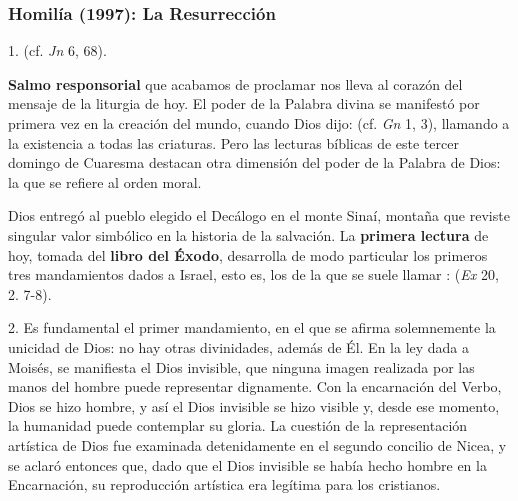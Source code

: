 \subsubsection{Homilía (1997): La Resurrección}


\begin{body}
1.  (cf. \textit{Jn} 6, 68).

 \textbf{Salmo responsorial} que acabamos de proclamar nos lleva al corazón del mensaje de la liturgia de hoy. El poder de la Palabra divina se manifestó por primera vez en la creación del mundo, cuando Dios dijo:  (cf. \textit{Gn} 1, 3), llamando a la existencia a todas las criaturas. Pero las lecturas bíblicas de este tercer domingo de Cuaresma destacan otra dimensión del poder de la Palabra de Dios: la que se refiere al orden moral.

Dios entregó al pueblo elegido el Decálogo en el monte Sinaí, montaña que reviste singular valor simbólico en la historia de la salvación.  La \textbf{primera lectura} de hoy, tomada del \textbf{libro del Éxodo}, desarrolla de modo particular los primeros tres mandamientos dados a Israel, esto es, los de la que se suele llamar :  (\textit{Ex} 20, 2. 7-8).

2. Es fundamental el primer mandamiento, en el que se afirma solemnemente la unicidad de Dios: no hay otras divinidades, además de Él. En la ley dada a Moisés, se manifiesta el Dios invisible, que ninguna imagen realizada por las manos del hombre puede representar dignamente. Con la encarnación del Verbo, Dios se hizo hombre, y así el Dios invisible se hizo visible y, desde ese momento, la humanidad puede contemplar su gloria. La cuestión de la representación artística de Dios fue examinada detenidamente en el segundo concilio de Nicea, y se aclaró entonces que, dado que el Dios invisible se había hecho hombre en la Encarnación, su reproducción artística era legítima para los cristianos.


\end{body}
